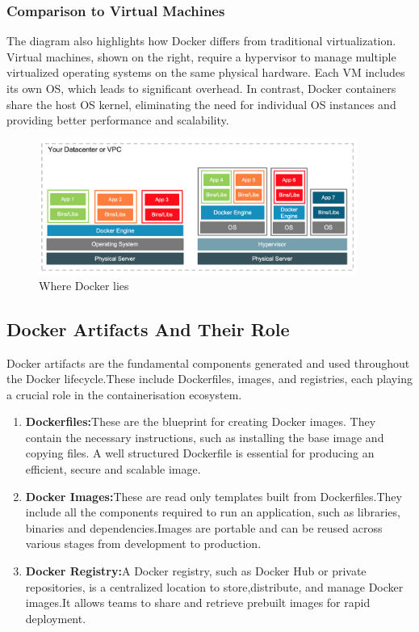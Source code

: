 \subsubsection{Comparison to Virtual Machines}
The diagram also highlights how Docker differs from traditional virtualization. Virtual machines, shown on the right, require a hypervisor to manage multiple virtualized operating systems on the same physical hardware. Each VM includes its own OS, which leads to significant overhead. In contrast, Docker containers share the host OS kernel, eliminating the need for individual OS instances and providing better performance and scalability.\cite{d}


\begin{figure}[ht]
  \centering
    \includegraphics[width=0.93\textwidth]{Figures/difference-vm-containers.png}
  \caption{Where Docker lies \cite{docker_conttainer_where}} %
  \label{docker_lies} %
\end{figure}
\subsection{Docker Artifacts And Their Role}
Docker artifacts are the fundamental components generated and used throughout the Docker lifecycle.These include Dockerfiles, images, and registries, each playing a crucial role in the containerisation ecosystem. 
\begin{enumerate}
    \item \textbf{Dockerfiles:}These are the blueprint for creating Docker images. They contain the necessary instructions, such as installing the base image and copying files. A well structured Dockerfile is essential for producing an efficient, secure and scalable image.
    \item \textbf{Docker Images:}These are read only templates built from Dockerfiles.They include all the components required to run an application, such as libraries, binaries and dependencies.Images are portable and can be reused across various stages from development to production. 
    \item \textbf{Docker Registry:}A Docker registry, such as Docker Hub or private repositories, is a centralized location to store,distribute, and manage Docker images.It allows teams to share and retrieve prebuilt images for rapid deployment. \cite{DockerArtifacts}
\end{enumerate}
